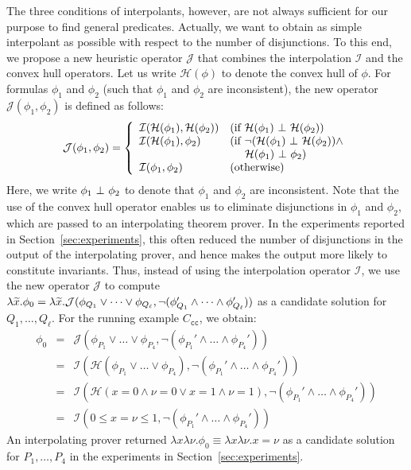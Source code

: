 The three conditions of interpolants, however, are not always sufficient 
for our purpose to find general predicates.  Actually, we want to obtain 
as simple interpolant as possible with respect to the number of 
disjunctions.
To this end, we propose a new heuristic operator \(\mathcal{J}\) that
combines the interpolation \(\mathcal{I}\) and the convex hull operators.
 Let us write \(\mathcal{H}(\phi)\) to denote the convex hull of \(\phi\).
 For formulas \(\phi_1\) and \(\phi_2\) (such that \(\phi_1\) and
\(\phi_2\) are inconsistent), the new operator
\(\mathcal{J}(\phi_1,\phi_2)\) is defined as follows:
\begin{eqnarray*}
\mathcal{J}(\phi_1,\phi_2) =
\left\{
\begin{array}{ll}
\mathcal{I}(\mathcal{H}(\phi_1),\mathcal{H}(\phi_2)) & (\mbox{if~}\mathcal{H}(\phi_1) \ \bot\  \mathcal{H}(\phi_2)) \\
\mathcal{I}(\mathcal{H}(\phi_1),\phi_2) & (\mbox{if~}\neg (\mathcal{H}(\phi_1) \ \bot\  \mathcal{H}(\phi_2)) \land \\
&\ \quad \mathcal{H}(\phi_1) \ \bot\  \phi_2) \\
\mathcal{I}(\phi_1,\phi_2) & (\mbox{otherwise})
\end{array}
\right.
\end{eqnarray*}
Here, we write \(\phi_1 \ \bot\  \phi_2\) to denote that \(\phi_1\) and
\(\phi_2\) are inconsistent.  Note that the use of the convex hull
operator enables us to eliminate disjunctions in \(\phi_1\) and
\(\phi_2\), which are passed to an interpolating theorem prover.
In the experiments reported in Section~\ref{sec:experiments}, this often
reduced the number of disjunctions in the output of the interpolating
prover, and hence makes the output more likely to constitute invariants.
%
Thus, instead of using the interpolation operator \(\mathcal{I}\), we 
use the new operator \(\mathcal{J}\) to compute \(\lambda \widetilde{x}. 
\phi_0=\lambda\widetilde{x}.\mathcal{J}(\phi_{Q_1} \lor \dots\lor 
\phi_{Q_{\ell}},\neg (\phi_{Q_1}' \land \dots \land\phi_{Q_{\ell}}'))\) 
as a candidate solution for \(Q_1,\dots,Q_{\ell}\).  For the running 
example \(C_{\texttt{cc}}\), we obtain:
\begin{eqnarray*}
\phi_0 &=& \mathcal{J}(\phi_{P_1} \lor \dots \lor \phi_{P_4},\neg (\phi_{P_1}' \land \dots \land \phi_{P_4}')) \\
&=& \mathcal{I}(\mathcal{H}(\phi_{P_1} \lor \dots \lor \phi_{P_4}),\neg (\phi_{P_1}' \land \dots \land \phi_{P_4}')) \\
&=& \mathcal{I}(\mathcal{H}(x=0 \land \nu=0 \lor x=1 \land \nu=1),\neg (\phi_{P_1}' \land \dots \land \phi_{P_4}')) \\
&=& \mathcal{I}(0 \leq x=\nu \leq 1,\neg (\phi_{P_1}' \land \dots \land \phi_{P_4}'))
\end{eqnarray*}
An interpolating prover returned \(\lambda x \lambda \nu.\phi_0 \equiv
\lambda x \lambda \nu.x=\nu\) as a candidate solution for
\(P_1,\dots,P_4\) in the experiments in Section~\ref{sec:experiments}.

